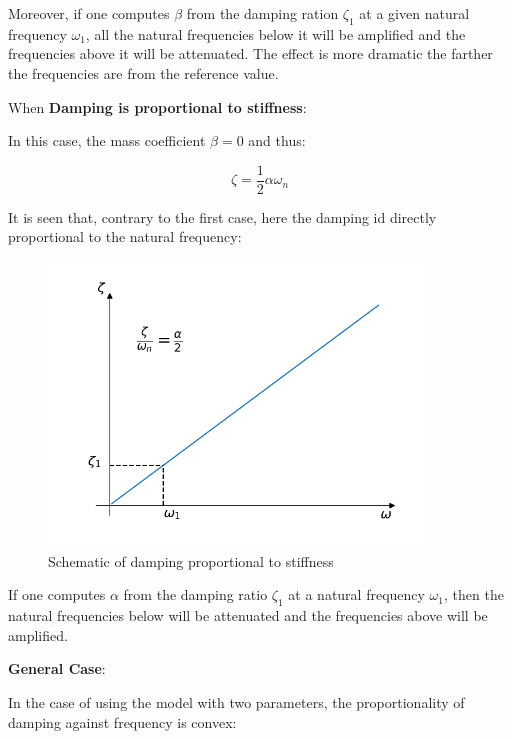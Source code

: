 \documentclass[10pt,b5paper,titlepage]{book}
\begin{document}
Moreover, if one computes $ \beta $ from the damping ration $ \zeta_1 $ at a given
natural frequency $ \omega_1 $, all the natural frequencies below it will be amplified
and the frequencies above it will be attenuated. The effect is more dramatic the farther
the frequencies are from the reference value.

When \textbf{Damping is proportional to stiffness}:

In this case, the mass coefficient $ \beta = 0 $ and thus:

\begin{equation}
    \zeta = \frac{1}{2} \alpha \omega_n
\end{equation}

It is seen that, contrary to the first case, here the damping id directly proportional
to the natural frequency:

\begin{figure}[ht]
    \centering
    \includegraphics[width=0.90\textwidth]{img/stiffness_dependent_damping.png}
    \caption{Schematic of damping proportional to stiffness}
    \label{fig:stiffness-dependent-damping-png}
\end{figure}

If one computes $ \alpha $ from the damping ratio $ \zeta_1 $ at a natural
frequency $ \omega_1 $, then the natural frequencies below will be attenuated and
the frequencies above will be amplified.

\textbf{General Case}:

In the case of using the model with two parameters, the proportionality of damping
against frequency is convex:
\end{document}
